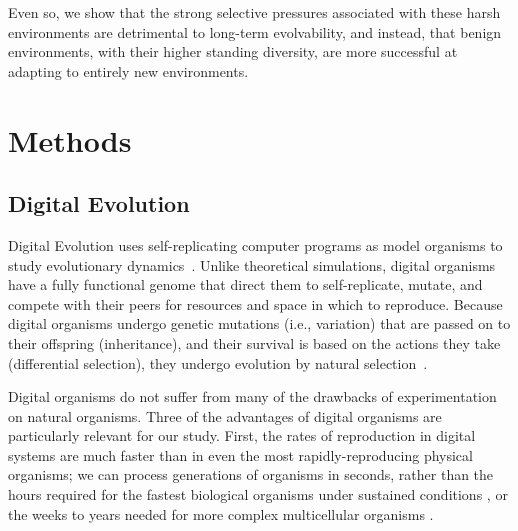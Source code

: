 \documentclass[10pt,letterpaper,final]{article}
\begin{document}
Even so, we show that the strong selective pressures associated with these harsh environments are detrimental to long-term evolvability, and instead, that benign environments, with their higher standing diversity, are more successful at adapting to entirely new environments.



\section*{Methods}

\subsection*{Digital Evolution}
Digital Evolution uses self-replicating computer programs as model organisms to study evolutionary dynamics~\cite{mckinley_harnessing_2008}. Unlike theoretical simulations, digital organisms have a fully functional genome that direct them to self-replicate, mutate, and compete with their peers for resources and space in which to reproduce. Because digital organisms undergo genetic mutations (i.e., variation) that are passed on to their offspring (inheritance), and their survival is based on the actions they take (differential selection), they undergo evolution by natural selection~\cite{dennett_darwins_1995}.

Digital organisms do not suffer from many of the drawbacks of experimentation on natural organisms.  Three of the advantages of digital organisms are particularly relevant for our study.  First, the rates of reproduction in digital systems are much faster than in even the most rapidly-reproducing physical organisms; we can process generations of organisms in seconds, rather than the hours required for the fastest biological organisms under sustained conditions \cite{ryan_evolution_1953,lenski_long-term_1991}, or the weeks to years needed for more complex multicellular organisms \cite{anderson_outcrossing_2010,stearns_experimental_2000}.
\end{document}
